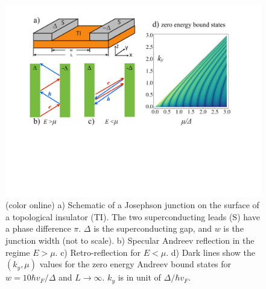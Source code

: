 \begin{figure}
\center
\includegraphics[width=\textwidth]{include/fig1.pdf}
\caption{(color online) a) Schematic of a Josephson junction on the surface of a topological insulator (TI).
The two superconducting leads (S) have a phase difference $\pi$. $\Delta$ is the superconducting gap, and 
$w$ is the junction width (not to scale).
b) Specular Andreev reflection in the regime $E>\mu$. c) Retro-reflection for $E<\mu$.
d) Dark lines show the $(k_y,\mu)$ values for the zero energy Andreev bound states for $w=10\hbar v_F/\Delta$ 
and $L\rightarrow \infty$.
$k_y$ is in unit of $\Delta/\hbar v_F$.
}\label{jjsetup}
\end{figure}

